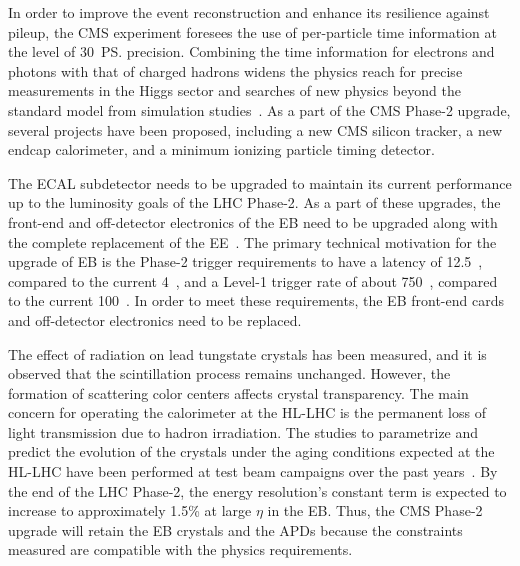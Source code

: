 In order to improve the event reconstruction and enhance its resilience against pileup, the CMS experiment foresees the use of per-particle time information at the level of 30~\ps precision. Combining the time information for electrons and photons with that of charged hadrons widens the physics reach for precise measurements in the Higgs sector and searches of new physics beyond the standard model from simulation studies~\cite{Butler:2019rpu}. As a part of the CMS Phase-2 upgrade, several projects have been proposed, including a new CMS silicon tracker, a new endcap calorimeter, and a minimum ionizing particle timing detector.

The ECAL subdetector needs to be upgraded to maintain its current performance up to the luminosity goals of the LHC Phase-2. As a part of these upgrades, the front-end and off-detector electronics of the EB need to be upgraded along with the complete replacement of the EE~\cite{CMSCollaboration:2015zni}. The primary technical motivation for the upgrade of EB is the Phase-2 trigger requirements to have a latency of 12.5~\mus, compared to the current 4~\mus, and a Level-1 trigger rate of about 750~\khz, compared to the current 100~\khz. In order to meet these requirements, the EB front-end cards and off-detector electronics need to be replaced.

The effect of radiation on lead tungstate crystals has been measured, and it is observed that the scintillation process remains unchanged. However, the formation of scattering color centers affects crystal transparency. The main concern for operating the calorimeter at the HL-LHC is the permanent loss of light transmission due to hadron irradiation. The studies to parametrize and predict the evolution of the crystals under the aging conditions expected at the HL-LHC have been performed at test beam campaigns over the past years~\cite{Adams:2016vi}. By the end of the LHC Phase-2, the energy resolution's constant term is expected to increase to approximately 1.5\% at large $\eta$ in the EB. Thus, the CMS Phase-2 upgrade will retain the EB crystals and the APDs because the constraints measured are compatible with the physics requirements.

